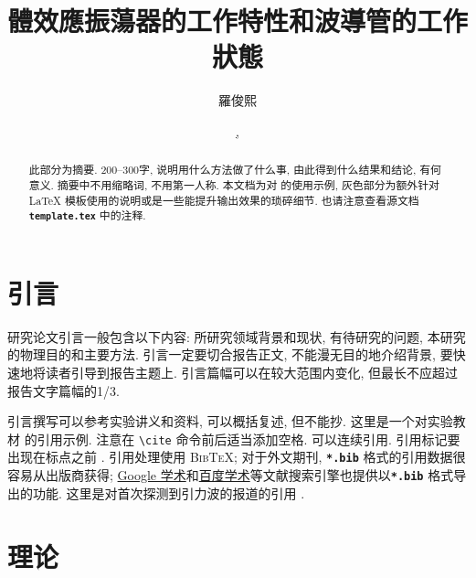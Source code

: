 \documentclass[font=default]{mpltx}
\makeatletter
\newcommand{\note}[1]{{\color{gray}#1}}
\newcommand*\cs[1]{\texttt{\textbackslash #1}}
\newcommand*\file[1]{\textbf{\texttt{#1}}}
\newcommand\releasedate{%
    \href{https://github.com/CastleStar14654/PKUMpLtX/releases/tag/\mpltx@fileversion}%
        {\mpltx@filedate, \mpltx@fileversion}}
\makeatother
\begin{document}
\title{體效應振蕩器的工作特性和波導管的工作狀態} %
\author{羅俊熙} %
\date{\releasedate}
\begin{abstract}
  此部分为摘要.
  200--300字, 说明用什么方法做了什么事, 由此得到什么结果和结论, 有何意义.
  摘要中不用缩略词, 不用第一人称.
  \note{本文档为对 \href{https://github.com/CastleStar14654/PKUMpLtX}{\pkg*{PKUMpLtX}} 的使用示例, 灰色部分为额外针对 \LaTeX{} 模板使用的说明或是一些能提升输出效果的琐碎细节.
    也请注意查看源文档 \file{template.tex} 中的注释.}
\end{abstract}

\maketitle

\section{引言}

研究论文引言一般包含以下内容:
所研究领域背景和现状,
有待研究的问题,
本研究的物理目的和主要方法.
引言一定要切合报告正文, 不能漫无目的地介绍背景, 要快速地将读者引导到报告主题上.
引言篇幅可以在较大范围内变化, 但最长不应超过报告文字篇幅的1/3.

引言撰写可以参考实验讲义和资料, 可以概括复述, 但不能抄.
\note{这里是一个对实验教材 \cite{jindaishiyan} 的引用示例.}
\note{注意在 \cs{cite} 命令前后适当添加空格.
  可以连续引用.
  引用标记要出现在标点之前 \cite{GBT7714,pr}.
  引用处理使用 \textsc{Bib\TeX};
  对于外文期刊, \file{*.bib} 格式的引用数据很容易从出版商获得;
  \href{https://scholar.google.com}{Google 学术}和\href{https://xueshu.baidu.com}{百度学术}等文献搜索引擎也提供以\file{*.bib} 格式导出的功能.
  这里是对首次探测到引力波的报道的引用 \cite{PhysRevLett.116.061102}.}

\section{理论}\label{sec:theory}
\end{document}
